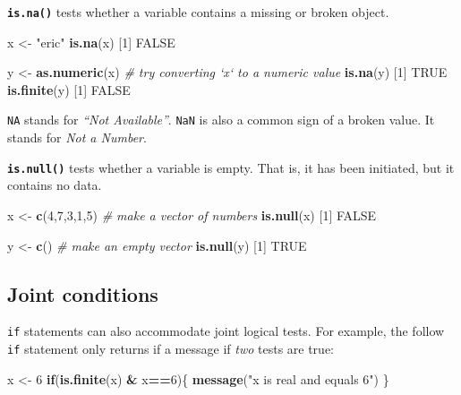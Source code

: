 \documentclass[
]{book}
\newenvironment{Shaded}{\begin{snugshade}}{\end{snugshade}}
\newcommand{\CommentTok}[1]{\textcolor[rgb]{0.56,0.35,0.01}{\textit{#1}}}
\newcommand{\ControlFlowTok}[1]{\textcolor[rgb]{0.13,0.29,0.53}{\textbf{#1}}}
\newcommand{\DecValTok}[1]{\textcolor[rgb]{0.00,0.00,0.81}{#1}}
\newcommand{\KeywordTok}[1]{\textcolor[rgb]{0.13,0.29,0.53}{\textbf{#1}}}
\newcommand{\NormalTok}[1]{#1}
\newcommand{\OperatorTok}[1]{\textcolor[rgb]{0.81,0.36,0.00}{\textbf{#1}}}
\newcommand{\OtherTok}[1]{\textcolor[rgb]{0.56,0.35,0.01}{#1}}
\newcommand{\StringTok}[1]{\textcolor[rgb]{0.31,0.60,0.02}{#1}}
\begin{document}
\textbf{\texttt{is.na()}} tests whether a variable contains a missing or broken object.

\begin{Shaded}
\begin{Highlighting}[]
\NormalTok{x <-}\StringTok{ "eric"}
\KeywordTok{is.na}\NormalTok{(x)}
\NormalTok{[}\DecValTok{1}\NormalTok{] }\OtherTok{FALSE}

\NormalTok{y <-}\StringTok{ }\KeywordTok{as.numeric}\NormalTok{(x) }\CommentTok{# try converting `x` to a numeric value}
\KeywordTok{is.na}\NormalTok{(y)}
\NormalTok{[}\DecValTok{1}\NormalTok{] }\OtherTok{TRUE}
\KeywordTok{is.finite}\NormalTok{(y)}
\NormalTok{[}\DecValTok{1}\NormalTok{] }\OtherTok{FALSE}
\end{Highlighting}
\end{Shaded}

\texttt{NA} stands for \emph{``Not Available''}. \texttt{NaN} is also a common sign of a broken value. It stands for \emph{Not a Number}.

\textbf{\texttt{is.null()}} tests whether a variable is empty. That is, it has been initiated, but it contains no data.

\begin{Shaded}
\begin{Highlighting}[]
\NormalTok{x <-}\StringTok{ }\KeywordTok{c}\NormalTok{(}\DecValTok{4}\NormalTok{,}\DecValTok{7}\NormalTok{,}\DecValTok{3}\NormalTok{,}\DecValTok{1}\NormalTok{,}\DecValTok{5}\NormalTok{) }\CommentTok{# make a vector of numbers}
\KeywordTok{is.null}\NormalTok{(x)}
\NormalTok{[}\DecValTok{1}\NormalTok{] }\OtherTok{FALSE}

\NormalTok{y <-}\StringTok{ }\KeywordTok{c}\NormalTok{() }\CommentTok{# make an empty vector}
\KeywordTok{is.null}\NormalTok{(y)}
\NormalTok{[}\DecValTok{1}\NormalTok{] }\OtherTok{TRUE}
\end{Highlighting}
\end{Shaded}

\hypertarget{joint-conditions}{%
\subsection*{Joint conditions}\label{joint-conditions}}

\texttt{if} statements can also accommodate joint logical tests. For example, the follow \texttt{if} statement only returns if a message if \emph{two} tests are true:

\begin{Shaded}
\begin{Highlighting}[]
\NormalTok{x <-}\StringTok{ }\DecValTok{6}
\ControlFlowTok{if}\NormalTok{(}\KeywordTok{is.finite}\NormalTok{(x) }\OperatorTok{&}\StringTok{ }\NormalTok{x}\OperatorTok{==}\DecValTok{6}\NormalTok{)\{}
  \KeywordTok{message}\NormalTok{(}\StringTok{"x is real and equals 6"}\NormalTok{)}
\NormalTok{\}}
\end{Highlighting}
\end{Shaded}
\end{document}
